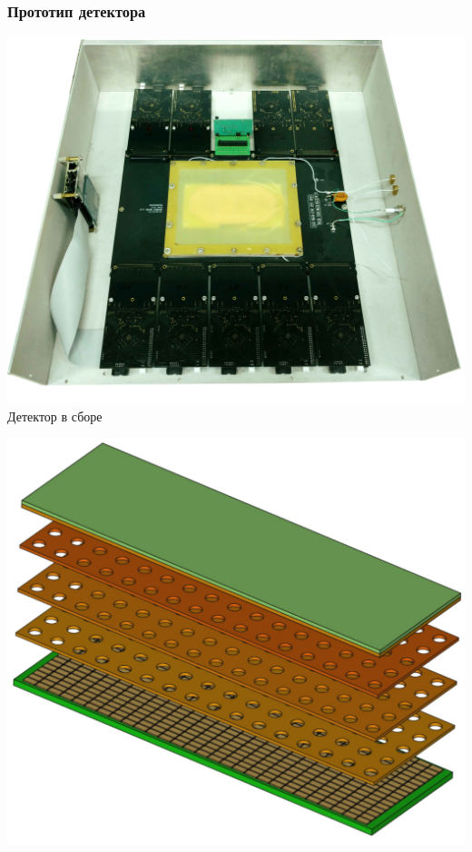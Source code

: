 \documentclass[14pt]{beamer}
\begin{document}
\begin{frame}[t]
\frametitle{Прототип детектора}
		\begin{minipage}[c]{0.59\linewidth}
			\centering
			\includegraphics[width=1\linewidth]{GEM_prototype.jpg} 
			\newline \tiny{Детектор в сборе}
		\end{minipage}
		\begin{minipage}[t]{0.39\linewidth}
		\includegraphics[width=1\linewidth, height = 0.4\textheight]{GEM_model.pdf}

\end{minipage}
\end{frame}
\end{document}
